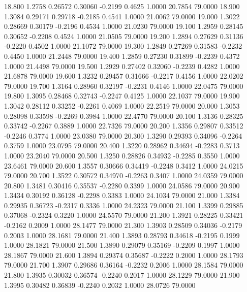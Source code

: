   18.800   1.2758   0.26572   0.30060  -0.2199   0.4625   1.0000  20.7854  79.0000
  18.900   1.3084   0.29171   0.29718  -0.2185   0.4541   1.0000  21.0062  79.0000
  19.000   1.3022   0.28669   0.30179  -0.2196   0.4534   1.0000  21.0230  79.0000
  19.100   1.2959   0.28145   0.30652  -0.2208   0.4524   1.0000  21.0505  79.0000
  19.200   1.2894   0.27629   0.31136  -0.2220   0.4502   1.0000  21.1072  79.0000
  19.300   1.2849   0.27269   0.31583  -0.2232   0.4450   1.0000  21.2448  79.0000
  19.400   1.2859   0.27230   0.31899  -0.2239   0.4372   1.0000  21.4498  79.0000
  19.500   1.2929   0.27402   0.32060  -0.2239   0.4282   1.0000  21.6878  79.0000
  19.600   1.3232   0.29457   0.31666  -0.2217   0.4156   1.0000  22.0202  79.0000
  19.700   1.3164   0.28960   0.32197  -0.2231   0.4146   1.0000  22.0475  79.0000
  19.800   1.3095   0.28468   0.32743  -0.2247   0.4125   1.0000  22.1037  79.0000
  19.900   1.3042   0.28112   0.33252  -0.2261   0.4069   1.0000  22.2519  79.0000
  20.000   1.3053   0.28098   0.33598  -0.2269   0.3984   1.0000  22.4770  79.0000
  20.100   1.3136   0.28325   0.33742  -0.2267   0.3889   1.0000  22.7326  79.0000
  20.200   1.3356   0.29807   0.33512  -0.2246   0.3774   1.0000  23.0380  79.0000
  20.300   1.3290   0.29393   0.34096  -0.2264   0.3759   1.0000  23.0795  79.0000
  20.400   1.3220   0.28962   0.34694  -0.2283   0.3713   1.0000  23.2040  79.0000
  20.500   1.3250   0.28826   0.34932  -0.2285   0.3550   1.0000  23.6461  79.0000
  20.600   1.3557   0.30666   0.34419  -0.2248   0.3412   1.0000  24.0215  79.0000
  20.700   1.3522   0.30572   0.34970  -0.2263   0.3407   1.0000  24.0359  79.0000
  20.800   1.3481   0.30416   0.35537  -0.2280   0.3399   1.0000  24.0586  79.0000
  20.900   1.3434   0.30192   0.36128  -0.2298   0.3383   1.0000  24.1034  79.0000
  21.000   1.3384   0.29935   0.36723  -0.2317   0.3336   1.0000  24.2323  79.0000
  21.100   1.3399   0.29885   0.37068  -0.2324   0.3220   1.0000  24.5570  79.0000
  21.200   1.3921   0.28225   0.33421  -0.2162   0.2009   1.0000  28.1477  79.0000
  21.300   1.3903   0.28509   0.34036  -0.2179   0.2003   1.0000  28.1681  79.0000
  21.400   1.3893   0.28793   0.34618  -0.2195   0.1999   1.0000  28.1821  79.0000
  21.500   1.3890   0.29079   0.35169  -0.2209   0.1997   1.0000  28.1867  79.0000
  21.600   1.3894   0.29374   0.35687  -0.2222   0.2000   1.0000  28.1793  79.0000
  21.700   1.3907   0.29686   0.36164  -0.2232   0.2006   1.0000  28.1584  79.0000
  21.800   1.3935   0.30032   0.36574  -0.2240   0.2017   1.0000  28.1229  79.0000
  21.900   1.3995   0.30482   0.36839  -0.2240   0.2032   1.0000  28.0726  79.0000

